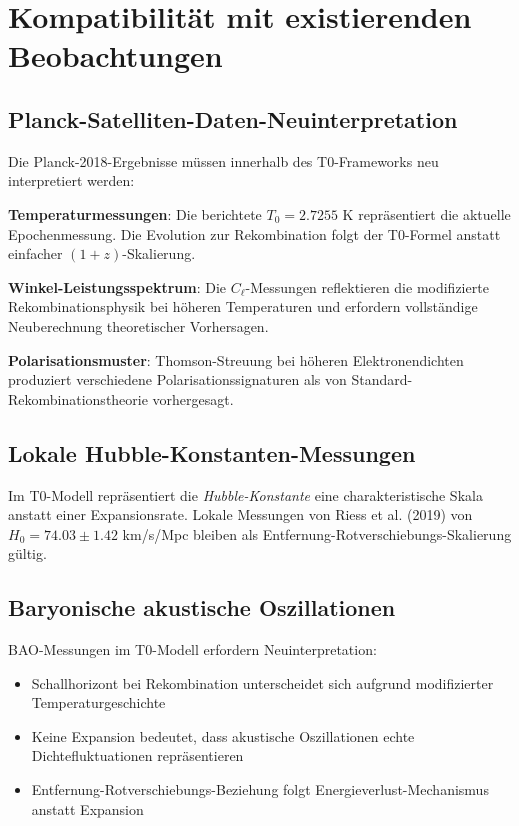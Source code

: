 \documentclass[12pt,a4paper]{article}
\begin{document}
	\section{Kompatibilität mit existierenden Beobachtungen}
	\label{sec:existierende_beobachtungen}
	
	\subsection{Planck-Satelliten-Daten-Neuinterpretation}
	\label{subsec:planck_neuinterpretation}
	
	Die Planck-2018-Ergebnisse müssen innerhalb des T0-Frameworks neu interpretiert werden:
	
	\textbf{Temperaturmessungen}: Die berichtete $T_0 = 2.7255$ K repräsentiert die aktuelle Epochenmessung. Die Evolution zur Rekombination folgt der T0-Formel anstatt einfacher $(1+z)$-Skalierung.
	
	\textbf{Winkel-Leistungsspektrum}: Die $C_\ell$-Messungen reflektieren die modifizierte Rekombinationsphysik bei höheren Temperaturen und erfordern vollständige Neuberechnung theoretischer Vorhersagen.
	
	\textbf{Polarisationsmuster}: Thomson-Streuung bei höheren Elektronendichten produziert verschiedene Polarisationssignaturen als von Standard-Rekombinationstheorie vorhergesagt.
	
	\subsection{Lokale Hubble-Konstanten-Messungen}
	\label{subsec:lokale_hubble}
	
	Im T0-Modell repräsentiert die \textit{Hubble-Konstante} eine charakteristische Skala anstatt einer Expansionsrate. Lokale Messungen von Riess et al. (2019) von $H_0 = 74.03 \pm 1.42$ km/s/Mpc bleiben als Entfernung-Rotverschiebungs-Skalierung gültig.
	
	\subsection{Baryonische akustische Oszillationen}
	\label{subsec:bao}
	
	BAO-Messungen im T0-Modell erfordern Neuinterpretation:
	\begin{itemize}
		\item Schallhorizont bei Rekombination unterscheidet sich aufgrund modifizierter Temperaturgeschichte
		\item Keine Expansion bedeutet, dass akustische Oszillationen echte Dichtefluktuationen repräsentieren
		\item Entfernung-Rotverschiebungs-Beziehung folgt Energieverlust-Mechanismus anstatt Expansion
	\end{itemize}
	
\end{document}
